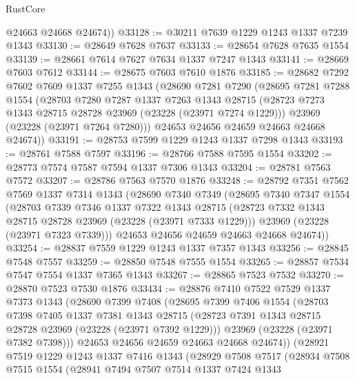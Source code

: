 \begin{lexlean}{RustCore}
\begin{coremodule}
        @24663
        @24668
        @24674))
@33128 := @30211 @7639 @1229 @1243 @1337 @7239 @1343
@33130 := @28649 @7628 @7637
@33133 := @28654 @7628 @7635 @1554
@33139 := @28661 @7614 @7627 @7634 @1337 @7247 @1343
@33141 := @28669 @7603 @7612
@33144 := @28675 @7603 @7610 @1876
@33185 := @28682
    @7292
    @7602
    @7609
    @1337
    @7255
    @1343
    (@28690
      @7281
      @7290
      (@28695
        @7281
        @7288
        @1554
        (@28703
          @7280
          @7287
          @1337
          @7263
          @1343
          @28715
          (@28723 @7273 @1343 @28715 @28728 @23969 (@23228 (@23971 @7274 @1229)))
          @23969
          (@23228 (@23971 @7264 @7280)))
        @24653
        @24656
        @24659
        @24663
        @24668
        @24674))
@33191 := @28753 @7599 @1229 @1243 @1337 @7298 @1343
@33193 := @28761 @7588 @7597
@33196 := @28766 @7588 @7595 @1554
@33202 := @28773 @7574 @7587 @7594 @1337 @7306 @1343
@33204 := @28781 @7563 @7572
@33207 := @28786 @7563 @7570 @1876
@33248 := @28792
    @7351
    @7562
    @7569
    @1337
    @7314
    @1343
    (@28690
      @7340
      @7349
      (@28695
        @7340
        @7347
        @1554
        (@28703
          @7339
          @7346
          @1337
          @7322
          @1343
          @28715
          (@28723 @7332 @1343 @28715 @28728 @23969 (@23228 (@23971 @7333 @1229)))
          @23969
          (@23228 (@23971 @7323 @7339)))
        @24653
        @24656
        @24659
        @24663
        @24668
        @24674))
@33254 := @28837 @7559 @1229 @1243 @1337 @7357 @1343
@33256 := @28845 @7548 @7557
@33259 := @28850 @7548 @7555 @1554
@33265 := @28857 @7534 @7547 @7554 @1337 @7365 @1343
@33267 := @28865 @7523 @7532
@33270 := @28870 @7523 @7530 @1876
@33434 := @28876
    @7410
    @7522
    @7529
    @1337
    @7373
    @1343
    (@28690
      @7399
      @7408
      (@28695
        @7399
        @7406
        @1554
        (@28703
          @7398
          @7405
          @1337
          @7381
          @1343
          @28715
          (@28723 @7391 @1343 @28715 @28728 @23969 (@23228 (@23971 @7392 @1229)))
          @23969
          (@23228 (@23971 @7382 @7398)))
        @24653
        @24656
        @24659
        @24663
        @24668
        @24674))
    (@28921
      @7519
      @1229
      @1243
      @1337
      @7416
      @1343
      (@28929
        @7508
        @7517
        (@28934
          @7508
          @7515
          @1554
          (@28941
            @7494
            @7507
            @7514
            @1337
            @7424
            @1343

\end{coremodule}
\end{lexlean}
